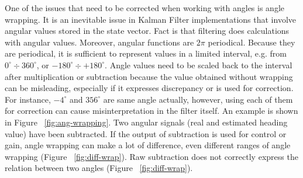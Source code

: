 One of the issues that need to be corrected when working with angles is angle wrapping. It is an inevitable issue in Kalman Filter implementations that involve angular values stored in the state vector. Fact is that filtering does calculations with angular values. Moreover, angular functions are $2\pi$ periodical. Because they are periodical, it is sufficient to represent values in a limited interval, e.g. from $0^{\circ} \div 360^{\circ}$, or $-180^{\circ} \div +180^{\circ}$. Angle values need to be scaled back to the interval after multiplication or subtraction because the value obtained without wrapping can be misleading, especially if it expresses discrepancy or is used for correction. For instance, $-4^{\circ}$ and $356^{\circ}$ are same angle actually, however, using each of them for correction can cause misinterpretation in the filter itself. An example is shown in Figure ~\ref{fig:ang-wrapping}. Two angular signals (real and estimated heading value) have been subtracted. If the output of subtraction is used for control or gain, angle wrapping can make a lot of difference, even different ranges of angle wrapping (Figure ~\ref{fig:diff-wrap}). Raw subtraction does not correctly express the relation between two angles (Figure ~\ref{fig:diff-wrap}).
